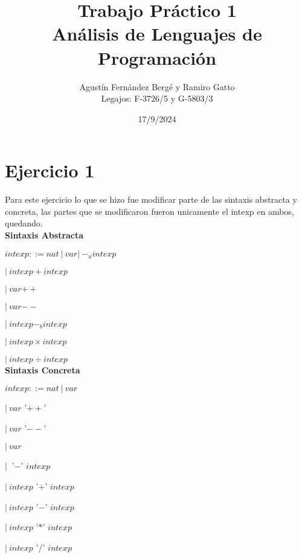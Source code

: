\documentclass[12pt, titlepage]{article}
\title{Trabajo Práctico 1\\ 
Análisis de Lenguajes de Programación}
\author{Agustín Fernández Bergé y Ramiro Gatto\\ Legajos: F-3726/5 y G-5803/3}
\date{17/9/2024}
\begin{document}
\maketitle

\section{Ejercicio 1}
Para este ejercicio lo que se hizo fue modificar parte de las sintaxis 
abstracta y concreta, las partes que se modificaron fueron unicamente el 
intexp en ambos, quedando.\\

\noindent \textbf{Sintaxis Abstracta}

$intexp ::= nat \: | \: var | \: -_u intexp$

\hspace{1.5cm}$|\: intexp +intexp$

\hspace{1.5cm}$|\: var \mathrel{+{+}}$

\hspace{1.5cm}$|\: var \mathrel{-{-}}$

\hspace{1.5cm}$|\: intexp -_b intexp$

\hspace{1.5cm}$|\: intexp \times intexp$

\hspace{1.5cm}$|\: intexp \div  intexp $\\

\noindent \textbf{Sintaxis Concreta}

$intexp ::= nat \:|\: var$

\hspace{1.5cm}$|\: var $ '$++$'

\hspace{1.5cm}$|\: var $ '$--$'

\hspace{1.5cm}$|\: var$

\hspace{1.5cm}$|\:$ '$-$' $intexp$

\hspace{1.5cm}$|\: intexp$ '$+$' $intexp$

\hspace{1.5cm}$|\: intexp$ '$-$' $intexp$

\hspace{1.5cm}$|\: intexp$ '$*$' $intexp$

\hspace{1.5cm}$|\: intexp$ '$/$' $intexp$
\end{document}
